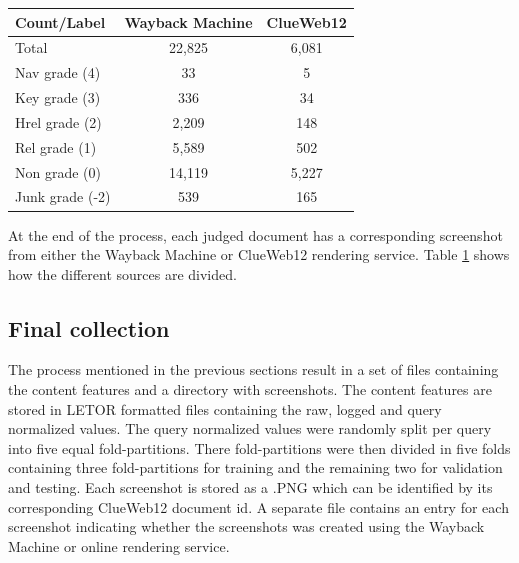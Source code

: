 \begin{table}[h]
  \label{tab:countsources}
  \begin{tabular}{ l  c  c  }
  \toprule
    Count/Label & Wayback Machine & ClueWeb12 \\
    \midrule
    Total & 22,825 & 6,081 \\
    Nav grade (4) & 33 & 5 \\
    Key grade (3) & 336 & 34 \\
    Hrel grade (2) & 2,209 & 148 \\
    Rel grade (1) & 5,589 & 502 \\
    Non grade (0) & 14,119 & 5,227 \\
    Junk grade (-2) & 539 & 165 \\
    \bottomrule
  \end{tabular} 
\end{table}

At the end of the process, each judged document has a corresponding screenshot from either the Wayback Machine or ClueWeb12 rendering service. Table \ref{tab:countsources} shows how the different sources are divided.

\subsection{Final collection}
The process mentioned in the previous sections result in a set of files containing the content features and a directory with screenshots. The content features are stored in LETOR formatted files containing the raw, logged and query normalized values. The query normalized values were randomly split per query into five equal fold-partitions. There fold-partitions were then divided in five folds containing three fold-partitions for training and the remaining two for validation and testing. Each screenshot is stored as a .PNG which can be identified by its corresponding ClueWeb12 document id. A separate file contains an entry for each screenshot indicating whether the screenshots was created using the Wayback Machine or online rendering service. 



